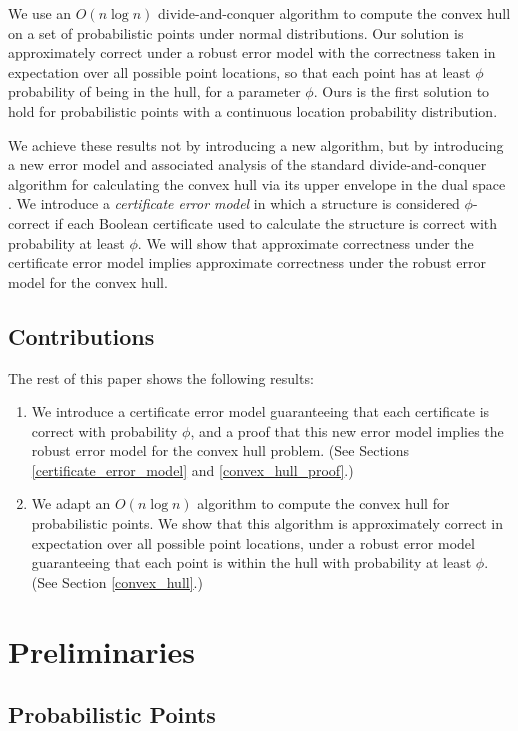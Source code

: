\documentclass[11pt]{article}
\begin{document}
We use an $O(n \log n)$ divide-and-conquer algorithm to compute the convex
hull on a set of probabilistic points under normal distributions.
Our solution is approximately correct under a robust error model with
the correctness taken in expectation  over all possible point locations, 
so that each point has at least $\phi$ probability of being in the hull, 
for a parameter $\phi$. 
Ours is the first solution to hold for
probabilistic points with a continuous location probability
distribution.

We achieve these results not by introducing a new algorithm,
but by introducing a new error model and associated analysis of the
standard divide-and-conquer algorithm for calculating the convex hull
via its upper envelope in the dual space \cite{ORourke1998book}.  
We introduce a \emph{certificate error model} in which a
structure is considered $\phi$-correct if each Boolean certificate
used to calculate the structure is correct with probability at least
$\phi$.  We will show that approximate correctness under the
certificate error model implies approximate correctness under the
robust error model for the convex hull.

\subsection{Contributions}

The rest of this paper shows the following results:
\begin{enumerate}
\item We introduce a certificate error model guaranteeing that each certificate is correct with probability $\phi$, and a proof that this new error model implies the robust error model for the convex hull problem.  (See Sections \ref{certificate_error_model} and \ref{convex_hull_proof}.)
\item We adapt an $O(n \log n)$ algorithm to compute the convex hull for probabilistic points.  We show that this algorithm is approximately correct in expectation over all possible point locations, under a robust error model guaranteeing that each point is within the hull with probability at least $\phi$.  (See Section \ref{convex_hull}.)
\end{enumerate}


\section{Preliminaries}
\subsection{Probabilistic Points}
\label{sec:prob_points}
\end{document}
